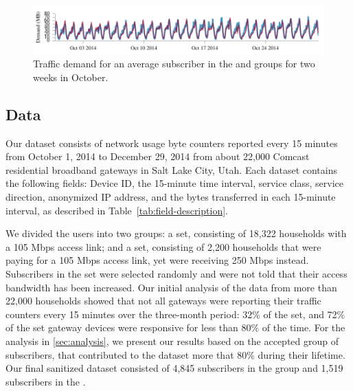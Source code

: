 \begin{figure}[t]
\centering
\includegraphics[width=\linewidth]{figures/traffic_demand_Oct.pdf}
  \caption{Traffic demand for an average subscriber in the \control{} and 
\treatment{} groups for two weeks in October.\label{fig:traffic-load}}
\end{figure}


\subsection{Data}

Our dataset consists of network usage byte counters reported every 15
minutes from October 1, 2014 to December 29, 2014 from about 22,000
Comcast residential broadband gateways in Salt Lake City, Utah.  Each
dataset contains the following fields: Device ID, the 15-minute time interval,
service class, service direction, anonymized IP address, and the bytes
transferred in each 15-minute interval, as described in
Table~\ref{tab:field-description}.

We divided the users into two groups: a \control{} set, consisting of
18,322 households with a 105 Mbps access link; and a \treatment{} set,
consisting of 2,200 households that were paying for a 105 Mbps access
link, yet were receiving 250 Mbps instead.  Subscribers in the
\treatment{} set were selected randomly and were not told that their
access bandwidth has been increased.  Our initial analysis of the data
from more than 22,000 households showed that not all gateways were
reporting their traffic counters every 15 minutes over the three-month
period: 32\% of the \treatment{} set, and 72\% of the \control{} set
gateway devices were responsive for less than 80\% of the time. For the
analysis in \autoref{sec:analysis}, we present our results based on the
accepted group of subscribers, that contributed to the dataset more that
80\% during their lifetime. Our final sanitized dataset consisted of
4,845 subscribers in the \control{} group and 1,519 subscribers in the
\treatment{}.


